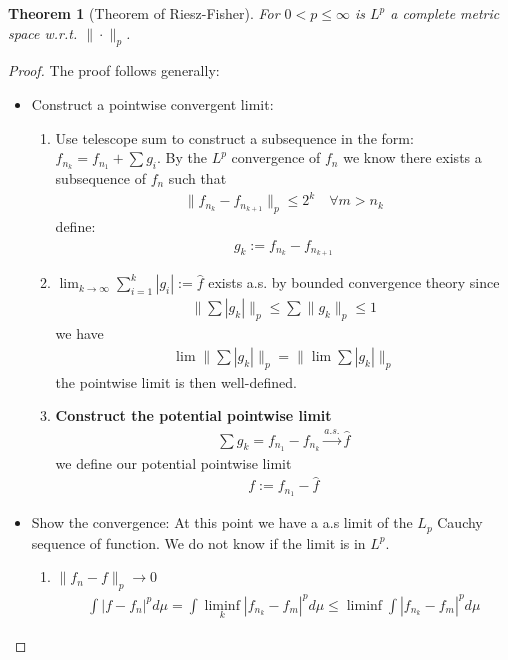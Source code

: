 \documentclass[a4paper,11pt,oneside,fleqn]{book}
\newtheorem{theorem}{Theorem}[section]
\theoremstyle{definition}
\theoremstyle{remark}
\begin{document}
\begin{theorem}[Theorem of Riesz-Fisher]
	For $0 < p \leq \infty$ is $L^p$ a complete metric space w.r.t. $\|\cdot\|_p$. 
\end{theorem}
\begin{proof}
	The proof follows generally:
	\begin{itemize}
		\item Construct a pointwise convergent limit:
			\begin{enumerate}
				\item Use telescope sum to construct a subsequence in the form: $f_{n_k} = f_{n_1} + \sum g_i$. By the $L^p$ convergence of $f_n$ we know there exists a subsequence of $f_n$ such that 
				\begin{align*}
					\|f_{n_k} - f_{n_{k+1}}\|_p \leq 2^k\quad \forall m > n_k				\end{align*}
				define:
				\begin{align*}
					g_k := f_{n_k} - f_{n_{k+1}}
				\end{align*}
				\item $\lim_{k \rightarrow \infty} \sum_{i = 1}^k | g_i| := \hat{f}$ exists a.s. by bounded convergence theory since
				\begin{align*}
					 \|\sum |g_k|\|_p \le \sum \|g_k\|_p \le 1
				\end{align*}
				we have
				\begin{align*}
					\lim \|\sum|g_k|\|_p = \|\lim \sum |g_k|\|_p
				\end{align*}
				the pointwise limit is then well-defined. 
				\item \textbf{Construct the potential pointwise limit} 
					\begin{align*}
						\sum g_k = f_{n_1} - f_{n_k} \overset{a.s.}{\longrightarrow}  \hat{f}
					\end{align*}
					we define our potential pointwise limit
					\begin{align*}
						f:=  f_{n_1} - \hat{f}
					\end{align*}
			\end{enumerate}
		\item Show the convergence: At this point we have a a.s limit of the $L_p$ Cauchy sequence of function. We do not know if the limit is in $L^p$.
		\begin{enumerate}
			\item $\|f_n - f \|_p \rightarrow 0$
			\begin{align*}
				\int |f - f_n|^p d\mu = \int \liminf_k |f_{n_k} - f_m|^p d\mu \leq \liminf \int |f_{n_k} - f_m|^p d\mu 

\end{align*}
\end{enumerate}
\end{itemize}
\end{proof}
\end{document}
